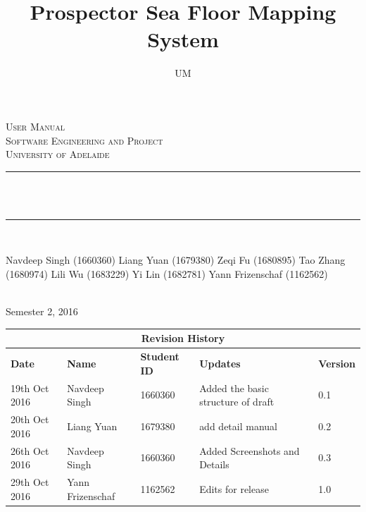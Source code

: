 \documentclass[12pt]{article}
\title{Prospector Sea Floor Mapping System}
\author{UM}
\makeatletter
\let\thetitle\@title
\makeatother
\begin{document}

\begin{titlepage}
	\centering
    \vspace*{0.0 cm}
    \textsc{\LARGE User Manual}\\[2.0 cm]
	\textsc{\Large Software Engineering and Project}\\[0.5 cm]			
	\textsc{\large University of Adelaide}\\[0.5 cm]
	\rule{\linewidth}{0.2 mm} \\[0.4 cm]
	{ \huge \bfseries \thetitle}\\
	\rule{\linewidth}{0.2 mm} \\[1.5 cm]
	
	\begin{minipage}{0.4\textwidth}
		\begin{center} \large
			Navdeep Singh (1660360)\linebreak
			Liang Yuan (1679380)\linebreak
			Zeqi Fu (1680895)\linebreak
			Tao Zhang (1680974)\linebreak
			Lili Wu (1683229)\linebreak
			Yi Lin (1682781)\linebreak
            Yann Frizenschaf (1162562)\linebreak
			\end{center}
	\end{minipage}\\[2 cm]
	
	{\large Semester 2, 2016}\\[2 cm]
 
	\vfill
	
\end{titlepage}


\begin{table}
\begin{tabular}{ | p{}| p{}| p{}| p{}|p{}|}
\hline
\multicolumn{5}{|c|}{\textbf{Revision History}}\\
\hline
\textbf \textbf{Date} &  \textbf\textbf{Name} &  \textbf\textbf{Student ID} & \textbf\textbf {Updates} & \textbf\textbf{Version} \\
\hline
19th Oct 2016 & Navdeep Singh & 1660360 & Added the basic structure of draft  & 0.1\\
\hline
20th Oct 2016 & Liang Yuan & 1679380 & add detail manual  & 0.2\\
\hline
26th Oct 2016 & Navdeep Singh & 1660360 & Added Screenshots and Details & 0.3\\
\hline
29th Oct 2016 & Yann Frizenschaf & 1162562 & Edits for release & 1.0\\
\hline
\end{tabular}

\end{table}
\end{document}
